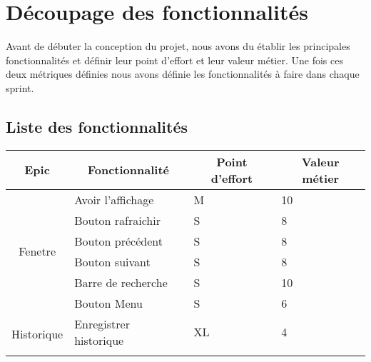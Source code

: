 \documentclass[10pt,a4paper]{article}
\begin{document}
\newpage

\section{Découpage des fonctionnalités}
Avant de débuter la conception du projet, nous avons du établir les principales fonctionnalités et définir leur point d'effort et leur valeur métier. Une fois ces deux métriques définies nous avons définie les fonctionnalités à faire dans chaque sprint. 

\subsection{Liste des fonctionnalités}
\begin{table}[H]
\begin{tabular}{|c|l|l|l|}
\hline
\textbf{Epic}                           & \multicolumn{1}{c|}{\textbf{Fonctionnalité}} & \multicolumn{1}{c|}{\textbf{Point d'effort}} & \multicolumn{1}{c|}{\textbf{Valeur métier}} \\ \hline
\multirow{6}{*}{Fenetre}                & Avoir l'affichage                            & M                                            & 10                                          \\ \cline{2-4} 
                                        & Bouton rafraichir                            & S                                            & 8                                           \\ \cline{2-4} 
                                        & Bouton précédent                             & S                                            & 8                                           \\ \cline{2-4} 
                                        & Bouton suivant                               & S                                            & 8                                           \\ \cline{2-4} 
                                        & Barre de recherche                           & S                                            & 10                                          \\ \cline{2-4} 
                                        & Bouton Menu                                  & S                                            & 6                                           \\ \hline
\multirow{5}{*}{Historique}             & Enregistrer historique                       & XL                                           & 4                                           \\ \cline{2-4} 

\end{tabular}
\end{table}
\end{document}
